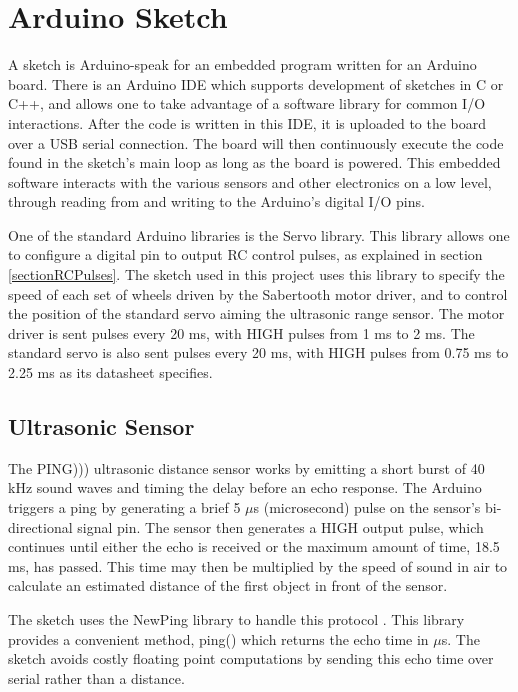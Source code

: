 \section{Arduino Sketch}
A sketch is Arduino-speak for an embedded program written for an Arduino board. There is an Arduino IDE which supports development of sketches in C or C++, and allows one to take advantage of a software library for common I/O interactions. After the code is written in this IDE, it is uploaded to the board over a USB serial connection. The board will then continuously execute the code found in the sketch's main loop as long as the board is powered. This embedded software interacts with the various sensors and other electronics on a low level, through reading from and writing to the Arduino's digital I/O pins.

One of the standard Arduino libraries is the Servo library. This library allows one to configure a digital pin to output RC control pulses, as explained in section \ref{sectionRCPulses}. The sketch used in this project uses this library to specify the speed of each set of wheels driven by the Sabertooth motor driver, and to control the position of the standard servo aiming the ultrasonic range sensor. The motor driver is sent pulses every 20 ms, with HIGH pulses from 1 ms to 2 ms. The standard servo is also sent pulses every 20 ms, with HIGH pulses from 0.75 ms to 2.25 ms as its datasheet specifies.

\subsection{Ultrasonic Sensor}
The PING))) ultrasonic distance sensor works by emitting a short burst of 40 kHz sound waves and timing the delay before an echo response. The Arduino triggers a ping by generating a brief 5 \(\mu\)s (microsecond) pulse on the sensor's bi-directional signal pin. The sensor then generates a HIGH output pulse, which continues until either the echo is received or the maximum amount of time, 18.5 ms, has passed. This time may then be multiplied by the speed of sound in air to calculate an estimated distance of the first object in front of the sensor. \cite{pingDocumentation}

The sketch uses the NewPing library to handle this protocol \cite{newPing}. This library provides a convenient method, ping() which returns the echo time in \(\mu\)s. The sketch avoids costly floating point computations by sending this echo time over serial rather than a distance.

